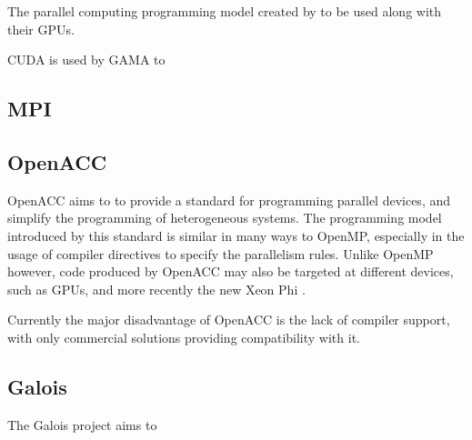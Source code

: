 \documentclass[main.tex]{subfiles}
\begin{document}
The parallel computing programming model created by \nvidia to be used along with their \acsp{GPU}. 

\acs{CUDA} is used by \acs{GAMA} to 

\subsection{\acs{MPI}}


\subsection{\acs{OpenACC}}

\acs{OpenACC} aims to to provide a standard for programming parallel devices, and simplify the programming of heterogeneous systems.
The programming model introduced by this standard is similar in many ways to \acs{OpenMP}, especially in the usage of compiler directives to specify the parallelism rules. Unlike \acs{OpenMP} however, code produced by \acs{OpenACC} may also be targeted at different devices, such as \acsp{GPU}, and more recently the new \intel Xeon Phi \cite{openacc-phi2012}.

Currently the major disadvantage of \acs{OpenACC} is the lack of compiler support, with only commercial solutions providing compatibility with it.


\subsection{Galois}

The Galois project aims to
\end{document}
